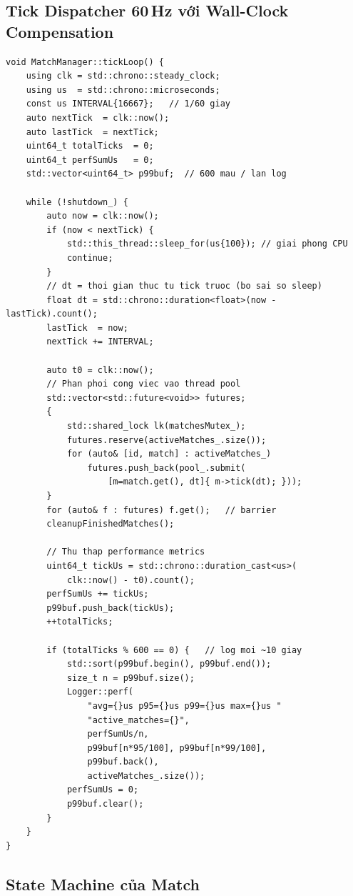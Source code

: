 \documentclass[12pt,a4paper]{report}
\begin{document}
\subsection{Tick Dispatcher 60\,Hz với Wall-Clock Compensation}

\begin{lstlisting}[style=cppStyle, caption={Tick loop 60Hz với bù lệch thời gian}, label={lst:tickloop}]
void MatchManager::tickLoop() {
    using clk = std::chrono::steady_clock;
    using us  = std::chrono::microseconds;
    const us INTERVAL{16667};   // 1/60 giay
    auto nextTick  = clk::now();
    auto lastTick  = nextTick;
    uint64_t totalTicks  = 0;
    uint64_t perfSumUs   = 0;
    std::vector<uint64_t> p99buf;  // 600 mau / lan log

    while (!shutdown_) {
        auto now = clk::now();
        if (now < nextTick) {
            std::this_thread::sleep_for(us{100}); // giai phong CPU
            continue;
        }
        // dt = thoi gian thuc tu tick truoc (bo sai so sleep)
        float dt = std::chrono::duration<float>(now - lastTick).count();
        lastTick  = now;
        nextTick += INTERVAL;

        auto t0 = clk::now();
        // Phan phoi cong viec vao thread pool
        std::vector<std::future<void>> futures;
        {
            std::shared_lock lk(matchesMutex_);
            futures.reserve(activeMatches_.size());
            for (auto& [id, match] : activeMatches_)
                futures.push_back(pool_.submit(
                    [m=match.get(), dt]{ m->tick(dt); }));
        }
        for (auto& f : futures) f.get();   // barrier
        cleanupFinishedMatches();

        // Thu thap performance metrics
        uint64_t tickUs = std::chrono::duration_cast<us>(
            clk::now() - t0).count();
        perfSumUs += tickUs;
        p99buf.push_back(tickUs);
        ++totalTicks;

        if (totalTicks % 600 == 0) {   // log moi ~10 giay
            std::sort(p99buf.begin(), p99buf.end());
            size_t n = p99buf.size();
            Logger::perf(
                "avg={}us p95={}us p99={}us max={}us "
                "active_matches={}",
                perfSumUs/n,
                p99buf[n*95/100], p99buf[n*99/100],
                p99buf.back(),
                activeMatches_.size());
            perfSumUs = 0;
            p99buf.clear();
        }
    }
}
\end{lstlisting}

\subsection{State Machine của Match}
\end{document}
